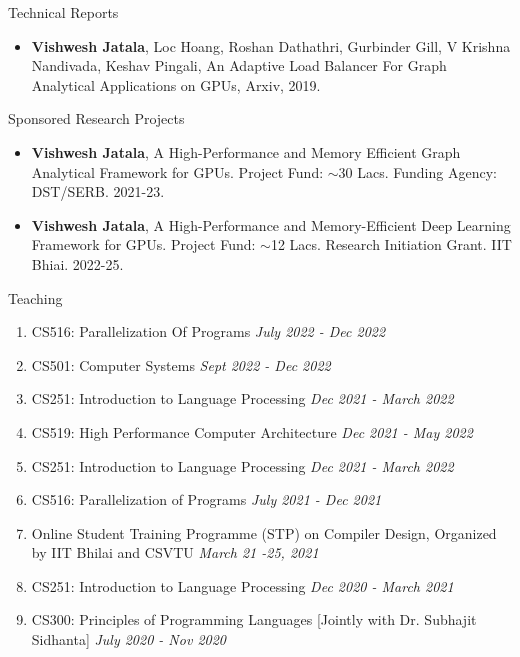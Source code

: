 \documentclass{resume} %
\begin{document}
\begin{rSection}{Technical Reports}
\begin{itemize}
\item \textbf{Vishwesh Jatala}, Loc Hoang, Roshan Dathathri, Gurbinder Gill, V Krishna Nandivada, Keshav Pingali, An Adaptive Load Balancer For Graph Analytical Applications on GPUs, Arxiv, 2019. 
\end{itemize}
\end{rSection}


\begin{rSection}{Sponsored Research Projects}
	\begin{itemize}
		\item \textbf{Vishwesh Jatala}, A High-Performance and Memory Efficient Graph Analytical Framework for GPUs. Project Fund: $\sim$30 Lacs. Funding Agency: DST/SERB. 2021-23.
		\item \textbf{Vishwesh Jatala}, A High-Performance and Memory-Efficient Deep Learning Framework for GPUs. Project Fund: $\sim$12 Lacs. Research Initiation Grant. IIT Bhiai. 2022-25.
	\end{itemize}
\end{rSection}

\begin{rSection}{Teaching}
	\begin{enumerate}
		\item CS516: Parallelization Of Programs \hfill {\em July 2022 - Dec 2022}
		\item CS501: Computer Systems \hfill {\em Sept 2022 - Dec 2022}
		\item CS251: Introduction to Language Processing \hfill {\em Dec 2021 - March 2022}
		\item CS519: High Performance Computer Architecture  \hfill {\em Dec 2021 - May 2022}	
		\item CS251: Introduction to Language Processing \hfill {\em Dec 2021 - March 2022}
		\item CS516: Parallelization of Programs  \hfill {\em July 2021 - Dec 2021}	
		\item Online Student Training Programme (STP) on Compiler Design, Organized by IIT Bhilai and CSVTU  \hfill {\em March 21 -25, 2021}	
		\item CS251: Introduction to Language Processing \hfill {\em Dec 2020 - March 2021}
		\item CS300: Principles of Programming Languages [{\scriptsize Jointly with Dr. Subhajit Sidhanta}] \hfill {\em July 2020 - Nov 2020}
	\end{enumerate}
\end{rSection}
\end{document}
